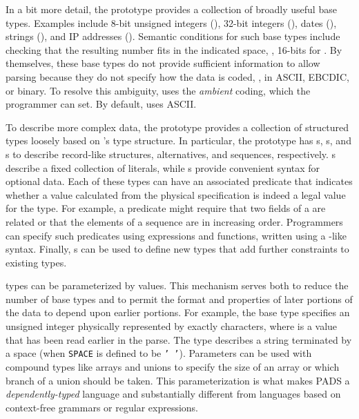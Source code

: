 \documentclass{sigplanconf}
\begin{document}
In a bit more detail,
the \pads{} prototype provides a collection of broadly useful base
types.  Examples include 8-bit unsigned integers (), 32-bit
integers (), dates (), strings (),
and IP addresses ().  Semantic conditions for such base types
include checking that the resulting number fits in the indicated
space, \ie, 16-bits for .  By themselves, these base types
do not provide sufficient information to allow parsing because they do
not specify how the data is coded, \ie{}, in ASCII, EBCDIC, or binary.
To resolve this ambiguity, \pads{} uses the \textit{ambient} coding,
which the programmer can set.  By default, \pads{} uses ASCII.  

To describe more complex data, the prototype provides a collection of
structured types loosely based on \C{}'s type structure.  In
particular, the prototype has s, s, and s
to describe record-like structures, alternatives, and sequences,
respectively.  s describe a fixed collection of literals,
while s provide convenient syntax for optional data.  Each of
these types can have an associated predicate that indicates whether a
value calculated from the physical specification is indeed a legal
value for the type.  For example, a predicate might require that two
fields of a  are related or that the elements of a
sequence are in increasing order.  Programmers can specify such
predicates using \pads{} expressions and functions, written using a
\C{}-like syntax.  Finally, \pads{} s can be used to
define new types that add further constraints to existing types.

\pads{} types can be parameterized by values.  This mechanism serves
both to reduce the number of base types and to permit the format and
properties of later portions of the data to depend upon earlier
portions.  For example, the base type  specifies
an unsigned integer physically represented by exactly 
characters, where  is a value that has been read earlier in the
parse.  The type  describes a string
terminated by a space (when \texttt{SPACE} is defined to be \texttt{' '}).  
Parameters can be used with compound types like arrays and unions to
specify the size of an array or which branch of a union should be
taken.  This parameterization is what makes PADS a {\em dependently-typed}
language and substantially different from languages based on
context-free grammars or regular expressions.
\end{document}
